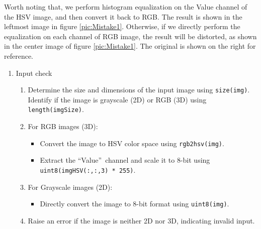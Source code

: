 \documentclass[a4paper,11pt]{article}
\begin{document}
Worth noting that, we perform histogram equalization on the Value channel of the HSV image, and then convert it back to RGB. The result is shown in the leftmost image in figure \ref{pic:Mistake1}. Otherwise, if we directly perform the equalization on each channel of RGB image, the result will be distorted, as shown in the center image of figure \ref{pic:Mistake1}. The original is shown on the right for reference.\\
\begin{enumerate}
    \item Input check
    \begin{enumerate}
        \item Determine the size and dimensions of the input image using \texttt{size(img)}. Identify if the image is grayscale (2D) or RGB (3D) using \texttt{length(imgSize)}.
        \item For RGB images (3D):
        \begin{itemize}
            \item Convert the image to HSV color space using \texttt{rgb2hsv(img)}.
            \item Extract the \textquotedblleft Value\textquotedblright\ channel and scale it to 8-bit using \texttt{uint8(imgHSV(:,:,3) * 255)}.
        \end{itemize}
        \item For Grayscale images (2D):
        \begin{itemize}
            \item Directly convert the image to 8-bit format using \texttt{uint8(img)}.
        \end{itemize}
        \item Raise an error if the image is neither 2D nor 3D, indicating invalid input.
    \end{enumerate}
\end{enumerate}
\end{document}
